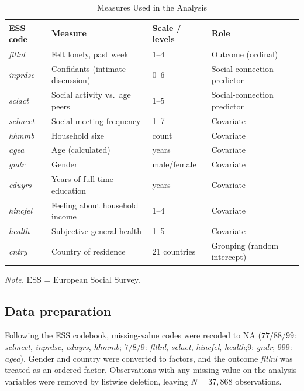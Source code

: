 \documentclass[12pt]{article}
\newcommand{\code}[1]{\textit{#1}}
\begin{document}
\begin{table}[H]
\footnotesize
\caption{Measures Used in the Analysis}
\label{tab:measures}
\begin{tabular}{llll}
\toprule
ESS code & Measure & Scale / levels & Role \\
\midrule
\code{fltlnl} & Felt lonely, past week & 1--4 & Outcome (ordinal) \\
\code{inprdsc} & Confidants (intimate discussion) & 0--6 & Social-connection predictor \\
\code{sclact} & Social activity vs.\ age peers & 1--5 & Social-connection predictor \\
\code{sclmeet} & Social meeting frequency & 1--7 & Covariate \\
\code{hhmmb} & Household size & count & Covariate \\
\code{agea} & Age (calculated) & years & Covariate \\
\code{gndr} & Gender & male/female & Covariate \\
\code{eduyrs} & Years of full-time education & years & Covariate \\
\code{hincfel} & Feeling about household income & 1--4 & Covariate \\
\code{health} & Subjective general health & 1--5 & Covariate \\
\code{cntry} & Country of residence & 21 countries & Grouping (random intercept) \\
\bottomrule
\end{tabular}

\vspace{6pt}

\raggedright
\textit{Note.} ESS = European Social Survey.
\end{table}

\subsection{Data preparation}

Following the ESS codebook, missing-value codes were recoded to NA ($77/88/99$: 
\code{sclmeet}, \code{inprdsc}, \code{eduyrs}, \code{hhmmb}; $7/8/9$: \code{fltlnl}, \code{sclact}, 
\code{hincfel}, \code{health};$9$: \code{gndr}; $999$: \code{agea}). Gender and country were converted 
to factors, and the outcome \code{fltlnl} was treated as an ordered factor.
Observations with any missing value on the analysis variables were removed by listwise
deletion, leaving $N=37{,}868$ observations. 
\end{document}
